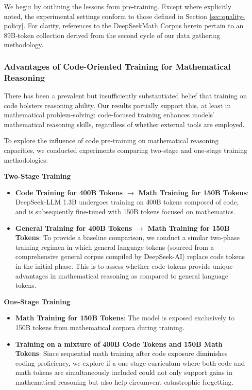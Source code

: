 We begin by outlining the lessons from pre-training. Except where explicitly noted, the experimental settings conform to those defined in Section \ref{sec:quality-policy}. For clarity, references to the DeepSeekMath Corpus herein pertain to an 89B-token collection derived from the second cycle of our data gathering methodology.

\subsubsection{Advantages of Code-Oriented Training for Mathematical Reasoning}

There has been a prevalent but insufficiently substantiated belief that training on code bolsters reasoning ability. Our results partially support this, at least in mathematical problem-solving: code-focused training enhances models’ mathematical reasoning skills, regardless of whether external tools are employed.

To explore the influence of code pre-training on mathematical reasoning capacities, we conducted experiments comparing two-stage and one-stage training methodologies:

\textbf{Two-Stage Training}

\begin{itemize}[topsep=0pt]
    \item \textbf{Code Training for 400B Tokens $\rightarrow$ Math Training for 150B Tokens}: DeepSeek-LLM 1.3B undergoes training on 400B tokens composed of code, and is subsequently fine-tuned with 150B tokens focused on mathematics.
    \item \textbf{General Training for 400B Tokens $\rightarrow$ Math Training for 150B Tokens}: To provide a baseline comparison, we conduct a similar two-phase training regimen in which general language tokens (sourced from a comprehensive general corpus compiled by DeepSeek-AI) replace code tokens in the initial phase. This is to assess whether code tokens provide unique advantages in mathematical reasoning as compared to general language tokens.
\end{itemize}

\textbf{One-Stage Training}

\begin{itemize}[topsep=0pt]
    \item \textbf{Math Training for 150B Tokens}: The model is exposed exclusively to 150B tokens from mathematical corpora during training.
    \item \textbf{Training on a mixture of 400B Code Tokens and 150B Math Tokens}: Since sequential math training after code exposure diminishes coding proficiency, we explore if a one-stage curriculum where both code and math tokens are simultaneously included could not only support gains in mathematical reasoning but also help circumvent catastrophic forgetting.
\end{itemize}

